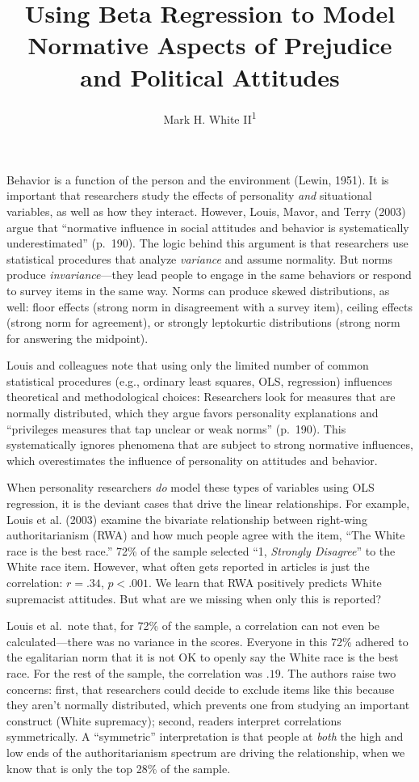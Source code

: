 \documentclass[english,,man]{apa6}
\title{Using Beta Regression to Model Normative Aspects of Prejudice and Political Attitudes}
\author{Mark H. White II\textsuperscript{1}}
\date{}
\affiliation{
\vspace{0.5cm}
\textsuperscript{1} YouGov}
\begin{document}
\maketitle

Behavior is a function of the person and the environment (Lewin, 1951). It is important that researchers study the effects of personality \emph{and} situational variables, as well as how they interact. However, Louis, Mavor, and Terry (2003) argue that \enquote{normative influence in social attitudes and behavior is systematically underestimated} (p.~190). The logic behind this argument is that researchers use statistical procedures that analyze \emph{variance} and assume normality. But norms produce \emph{invariance}---they lead people to engage in the same behaviors or respond to survey items in the same way. Norms can produce skewed distributions, as well: floor effects (strong norm in disagreement with a survey item), ceiling effects (strong norm for agreement), or strongly leptokurtic distributions (strong norm for answering the midpoint).

Louis and colleagues note that using only the limited number of common statistical procedures (e.g., ordinary least squares, OLS, regression) influences theoretical and methodological choices: Researchers look for measures that are normally distributed, which they argue favors personality explanations and \enquote{privileges measures that tap unclear or weak norms} (p.~190). This systematically ignores phenomena that are subject to strong normative influences, which overestimates the influence of personality on attitudes and behavior.

When personality researchers \emph{do} model these types of variables using OLS regression, it is the deviant cases that drive the linear relationships. For example, Louis et al. (2003) examine the bivariate relationship between right-wing authoritarianism (RWA) and how much people agree with the item, \enquote{The White race is the best race.} 72\% of the sample selected \enquote{1, \emph{Strongly Disagree}} to the White race item. However, what often gets reported in articles is just the correlation: \(r = .34\), \(p < .001\). We learn that RWA positively predicts White supremacist attitudes. But what are we missing when only this is reported?

Louis et al.~note that, for 72\% of the sample, a correlation can not even be calculated---there was no variance in the scores. Everyone in this 72\% adhered to the egalitarian norm that it is not OK to openly say the White race is the best race. For the rest of the sample, the correlation was \(.19\). The authors raise two concerns: first, that researchers could decide to exclude items like this because they aren't normally distributed, which prevents one from studying an important construct (White supremacy); second, readers interpret correlations symmetrically. A \enquote{symmetric} interpretation is that people at \emph{both} the high and low ends of the authoritarianism spectrum are driving the relationship, when we know that is only the top 28\% of the sample.
\end{document}
